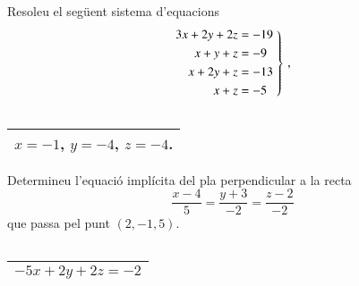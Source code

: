 \documentclass[11pt,catalan]{article}
\begin{document}
\begin{enunciat}
Resoleu el següent sistema d'equacions
\[
  \left.\aligned 3 x + 2 y + 2 z &= -19 \\ x + y + z &= -9 \\ x + 2 y + z &= -13 \\ x + z &= -5 \endaligned\;\right\}\,,
\]
\end{enunciat}

\begin{quadricula}
\begin{tabular}{|C{5cm}{0.5cm}|}
\hline
  \\
\hline
\end{tabular}
\end{quadricula}

\begin{solucio}
\begin{center}
\begin{tabular}{|C{5cm}{0.5cm}|}
\hline
$x=-1$, $y=-4$, $z=-4$. \\
\hline
\end{tabular}
\end{center}
\end{solucio}


\begin{enunciat}
Determineu l'equació implícita del pla perpendicular a la recta 
\[
  \frac{x - 4}{5} = \frac{y + 3}{-2} = \frac{z - 2}{-2}
\]
que passa pel punt $(2,-1,5)$.
\end{enunciat}

\begin{quadricula}
\begin{tabular}{|C{5cm}{0.5cm}|}
\hline
  \\
\hline
\end{tabular}
\end{quadricula}

\begin{solucio}
\begin{center}
\begin{tabular}{|C{5cm}{0.5cm}|}
\hline
$- 5 x + 2 y + 2 z = -2$ \\
\hline
\end{tabular}
\end{center}
\end{solucio}
\end{document}
